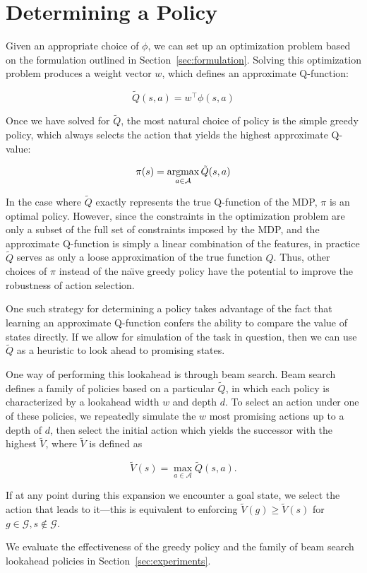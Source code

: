 \section{Determining a Policy}

Given an appropriate choice of $\phi$, we can set up an optimization problem
based on the formulation outlined in Section~\ref{sec:formulation}. Solving this
optimization problem produces a weight vector $w$, which defines an approximate
Q-function:

\begin{equation}
  \tilde{Q}(s,a) = w^\intercal \phi(s,a)
\end{equation}


Once we have solved for $\tilde{Q}$, the most natural choice of policy is the
simple greedy policy, which always selects the action that yields the highest
approximate Q-value:

\begin{equation}
  \pi(s) = \operatorname*{argmax}_{a \in \mathcal{A}} \tilde{Q}(s,a)
\end{equation}

In the case where $\tilde{Q}$ exactly represents the true Q-function of the MDP,
$\pi$ is an optimal policy. However, since the constraints in the optimization
problem are only a subset of the full set of constraints imposed by the MDP, and
the approximate Q-function is simply a linear combination of the features, in
practice $\tilde{Q}$ serves as only a loose approximation of the true function
$Q$. Thus, other choices of $\pi$ instead of the na\"{\i}ve greedy policy have
the potential to improve the robustness of action selection.

One such strategy for determining a policy takes advantage of the fact that
learning an approximate Q-function confers the ability to compare the value of
states directly. If we allow for simulation of the task in question, then we can
use $\tilde{Q}$ as a heuristic to look ahead to promising states.

One way of performing this lookahead is through beam search. Beam search defines
a family of policies based on a particular $\tilde{Q}$, in which each policy is
characterized by a lookahead width $w$ and depth $d$. To select an action under
one of these policies, we repeatedly simulate the $w$ most promising actions up
to a depth of $d$, then select the initial action which yields the successor
with the highest $\tilde{V}$, where $\tilde{V}$ is defined as

\begin{equation}
  \tilde{V}(s) = \max_{a \in \mathcal{A}} \tilde{Q}(s, a).
\end{equation}


If at any point during this expansion we encounter a goal state, we select the
action that leads to it---this is equivalent to enforcing $\tilde{V}(g) \geq
\tilde{V}(s)$ for $g \in \mathcal{G}, s \not\in \mathcal{G}$.

We evaluate the effectiveness of the greedy policy and the family of beam search
lookahead policies in Section~\ref{sec:experiments}.
